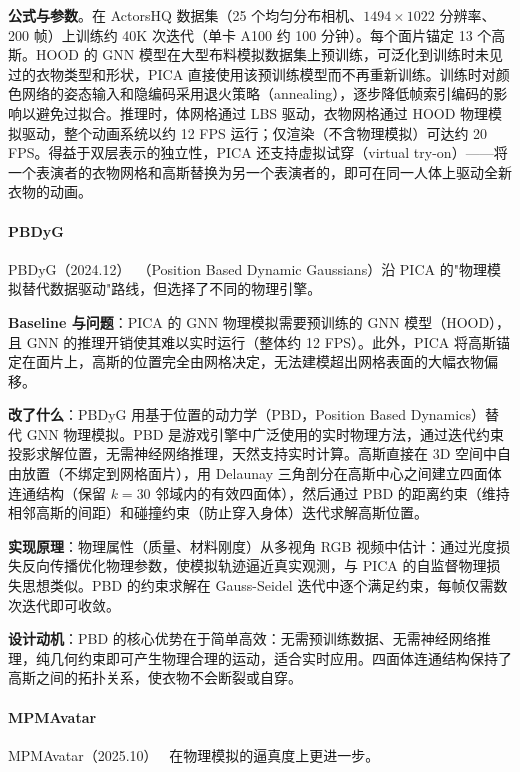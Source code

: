 \textbf{公式与参数}。在 ActorsHQ 数据集（25 个均匀分布相机、$1494 \times 1022$ 分辨率、200 帧）上训练约 40K 次迭代（单卡 A100 约 100 分钟）。每个面片锚定 13 个高斯。HOOD 的 GNN 模型在大型布料模拟数据集上预训练，可泛化到训练时未见过的衣物类型和形状，PICA 直接使用该预训练模型而不再重新训练。训练时对颜色网络的姿态输入和隐编码采用退火策略（annealing），逐步降低帧索引编码的影响以避免过拟合。推理时，体网格通过 LBS 驱动，衣物网格通过 HOOD 物理模拟驱动，整个动画系统以约 12 FPS 运行；仅渲染（不含物理模拟）可达约 20 FPS。得益于双层表示的独立性，PICA 还支持虚拟试穿（virtual try-on）——将一个表演者的衣物网格和高斯替换为另一个表演者的，即可在同一人体上驱动全新衣物的动画。

\paragraph{PBDyG}

PBDyG（2024.12）~\cite{2412_04433}（Position Based Dynamic Gaussians）沿 PICA 的"物理模拟替代数据驱动"路线，但选择了不同的物理引擎。

\textbf{Baseline 与问题}：PICA 的 GNN 物理模拟需要预训练的 GNN 模型（HOOD），且 GNN 的推理开销使其难以实时运行（整体约 12 FPS）。此外，PICA 将高斯锚定在面片上，高斯的位置完全由网格决定，无法建模超出网格表面的大幅衣物偏移。

\textbf{改了什么}：PBDyG 用基于位置的动力学（PBD，Position Based Dynamics）替代 GNN 物理模拟。PBD 是游戏引擎中广泛使用的实时物理方法，通过迭代约束投影求解位置，无需神经网络推理，天然支持实时计算。高斯直接在 3D 空间中自由放置（不绑定到网格面片），用 Delaunay 三角剖分在高斯中心之间建立四面体连通结构（保留 $k=30$ 邻域内的有效四面体），然后通过 PBD 的距离约束（维持相邻高斯的间距）和碰撞约束（防止穿入身体）迭代求解高斯位置。

\textbf{实现原理}：物理属性（质量、材料刚度）从多视角 RGB 视频中估计：通过光度损失反向传播优化物理参数，使模拟轨迹逼近真实观测，与 PICA 的自监督物理损失思想类似。PBD 的约束求解在 Gauss-Seidel 迭代中逐个满足约束，每帧仅需数次迭代即可收敛。

\textbf{设计动机}：PBD 的核心优势在于简单高效：无需预训练数据、无需神经网络推理，纯几何约束即可产生物理合理的运动，适合实时应用。四面体连通结构保持了高斯之间的拓扑关系，使衣物不会断裂或自穿。

\paragraph{MPMAvatar}

MPMAvatar（2025.10）~\cite{2510_01619} 在物理模拟的逼真度上更进一步。

